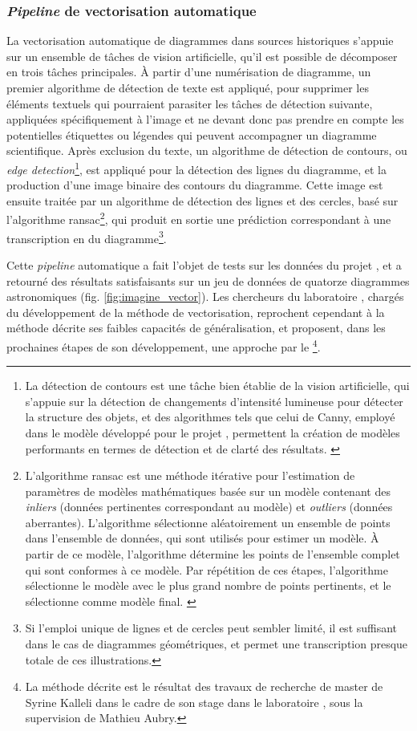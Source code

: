 	\subsubsection{\textit{Pipeline} de vectorisation automatique}
	La vectorisation automatique de diagrammes dans sources historiques s'appuie sur un ensemble de tâches de vision artificielle, qu'il est possible de décomposer en trois tâches principales. À partir d'une numérisation de diagramme, un premier algorithme de détection de texte est appliqué, pour supprimer les éléments textuels qui pourraient parasiter les tâches de détection suivante, appliquées spécifiquement à l'image et ne devant donc pas prendre en compte les potentielles étiquettes ou légendes qui peuvent accompagner un diagramme scientifique. Après exclusion du texte, un algorithme de détection de contours, ou \textit{edge detection}\footnote{La détection de contours est une tâche bien établie de la vision artificielle, qui s'appuie sur la détection de changements d'intensité lumineuse pour détecter la structure des objets, et des algorithmes tels que celui de Canny, employé dans le modèle développé pour le projet \eida, permettent la création de modèles performants en termes de détection et de clarté des résultats. \cite{cannyComputationalApproachEdge1986}}, est appliqué pour la détection des lignes du diagramme, et la production d'une image binaire des contours du diagramme. Cette image est ensuite traitée par un algorithme de détection des lignes et des cercles, basé sur l'algorithme \acrfull{ransac}\footnote{L'algorithme \acrshort{ransac} est une méthode itérative pour l'estimation de paramètres de modèles mathématiques basée sur un modèle contenant des \textit{inliers} (données pertinentes correspondant au modèle) et \textit{outliers} (données aberrantes). L'algorithme sélectionne aléatoirement un ensemble de points dans l'ensemble de données, qui sont utilisés pour estimer un modèle. À partir de ce modèle, l'algorithme détermine les points de l'ensemble complet qui sont conformes à ce modèle. Par répétition de ces étapes, l'algorithme sélectionne le modèle avec le plus grand nombre de points pertinents, et le sélectionne comme modèle final. \cite{derpanisOverviewRANSACAlgorithm2010}}, qui produit en sortie une prédiction correspondant à une transcription en \svg du diagramme\footnote{Si l'emploi unique de lignes et de cercles peut sembler limité, il est suffisant dans le cas de diagrammes géométriques, et permet une transcription presque totale de ces illustrations.}. 
	
	Cette \textit{pipeline} automatique a fait l'objet de tests sur les données du projet \eida, et a retourné des résultats satisfaisants sur un jeu de données de quatorze diagrammes astronomiques (fig. \ref{fig:imagine_vector}). Les chercheurs du laboratoire \imagine, chargés du développement de la méthode de vectorisation, reprochent cependant à la méthode décrite ses faibles capacités de généralisation, et proposent, dans les prochaines étapes de son développement, une approche par le \dl\footnote{La méthode décrite est le résultat des travaux de recherche de master de Syrine Kalleli dans le cadre de son stage dans le laboratoire \imagine, sous la supervision de Mathieu Aubry.}.
	
